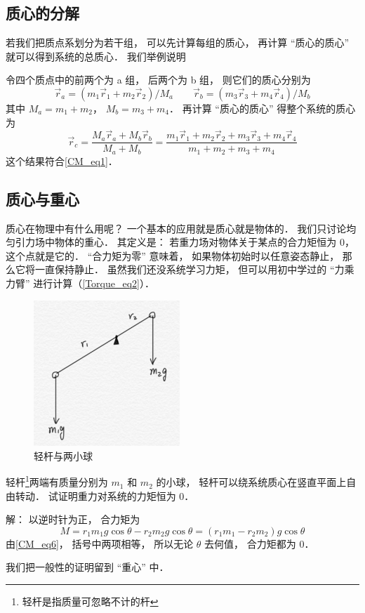 \subsection{质心的分解}
若我们把质点系划分为若干组， 可以先计算每组的质心， 再计算 “质心的质心” 就可以得到系统的总质心． 我们举例说明
\begin{exam}{}
令四个质点中的前两个为 a 组， 后两个为 b 组， 则它们的质心分别为
\begin{equation}
\vec r_a = (m_1 \vec r_1 + m_2 \vec r_2)/M_a
\qquad
\vec r_b = (m_3 \vec r_3 + m_4 \vec r_4)/M_b
\end{equation}
其中 $M_a = m_1 + m_2$， $M_b = m_3 + m_4$． 再计算 “质心的质心” 得整个系统的质心为
\begin{equation}
\vec r_c = \frac{M_a \vec r_a + M_b \vec r_b}{M_a + M_b} = \frac{m_1 \vec r_1 + m_2 \vec r_2 + m_3 \vec r_3 + m_4 \vec r_4}{m_1 + m_2 + m_3 + m_4}
\end{equation}
这个结果符合\autoref{CM_eq1}．
\end{exam}

\subsection{质心与重心}
质心在物理中有什么用呢？ 一个基本的应用就是质心就是物体的． 我们只讨论均匀引力场中物体的重心． 其定义是： 若重力场对物体关于某点的合力矩恒为 0， 这个点就是它的． “合力矩为零” 意味着， 如果物体初始时以任意姿态静止， 那么它将一直保持静止． 虽然我们还没系统学习力矩， 但可以用初中学过的 “力乘力臂” 进行计算（\autoref{Torque_eq2}）．

\begin{exam}{}\label{CM_ex1}
\begin{figure}[ht]
\centering
\includegraphics[width=5.5cm]{./figures/CM1.png}
\caption{轻杆与两小球} \label{CM_fig1}
\end{figure}

轻杆\footnote{轻杆是指质量可忽略不计的杆}两端有质量分别为 $m_1$ 和 $m_2$ 的小球， 轻杆可以绕系统质心在竖直平面上自由转动． 试证明重力对系统的力矩恒为 0．

解： 以逆时针为正， 合力矩为
\begin{equation}
M = r_1 m_1 g \cos\theta - r_2 m_2 g \cos\theta = (r_1 m_1 - r_2 m_2) g \cos\theta
\end{equation}
由\autoref{CM_eq6}， 括号中两项相等， 所以无论 $\theta$ 去何值， 合力矩都为 0．
\end{exam}
我们把一般性的证明留到 “重心” 中．

